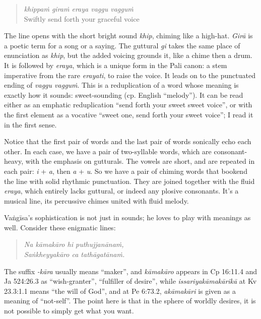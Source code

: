 \documentclass[12pt,openany]{book}%
\begin{document}
\begin{quotation}%
\textit{\textsanskrit{khippaṁ} \textsanskrit{giraṁ} eraya vaggu \textsanskrit{vagguṁ}} \\
Swiftly send forth your graceful voice

%
\end{quotation}

The line opens with the short bright sound \textit{khip}, chiming like a high-hat. \textit{\textsanskrit{Girā}} is a poetic term for a song or a saying. The guttural \textit{gi} takes the same place of enunciation as \textit{khip}, but the added voicing grounds it, like a chime then a drum. It is followed by \textit{eraya}, which is a unique form in the Pali canon: a stem imperative from the rare \textit{erayati}, to raise the voice. It leads on to the punctuated ending of \textit{vaggu \textsanskrit{vagguṁ}}. This is a reduplication of a word whose meaning is exactly how it sounds: sweet-sounding (cp. English “melody”). It can be read either as an emphatic reduplication “send forth your sweet sweet voice”, or with the first element as a vocative “sweet one, send forth your sweet voice”; I read it in the first sense.

Notice that the first pair of words and the last pair of words sonically echo each other. In each case, we have a pair of two-syllable words, which are consonant-heavy, with the emphasis on gutturals. The vowels are short, and are repeated in each pair: \textit{i} + \textit{a}, then \textit{a} + \textit{u}. So we have a pair of chiming words that bookend the line with solid rhythmic punctuation. They are joined together with the fluid \textit{eraya}, which entirely lacks guttural, or indeed any plosive consonants. It’s a musical line, its percussive chimes united with fluid melody.

\textsanskrit{Vaṅgīsa}’s sophistication is not just in sounds; he loves to play with meanings as well. Consider these enigmatic lines:

\begin{quotation}%
\textit{Na \textsanskrit{kāmakāro} hi \textsanskrit{puthujjanānaṁ},} \\
\textit{\textsanskrit{Saṅkheyyakāro} ca \textsanskrit{tathāgatānaṁ}.}

%
\end{quotation}

The suffix \textit{-\textsanskrit{kāra}} usually means “maker”, and \textit{\textsanskrit{kāmakāro}} appears in Cp 16:11.4 and Ja 524:26.3 as “wish-granter”, “fulfiller of desire”, while \textit{\textsanskrit{issariyakāmakārikā}} at Kv 23.3:1.1 means “the will of God”, and at Pe 6:73.2, \textit{\textsanskrit{akāmakāri}} is given as a meaning of “not-self”. The point here is that in the sphere of worldly desires, it is not possible to simply get what you want.
\end{document}
